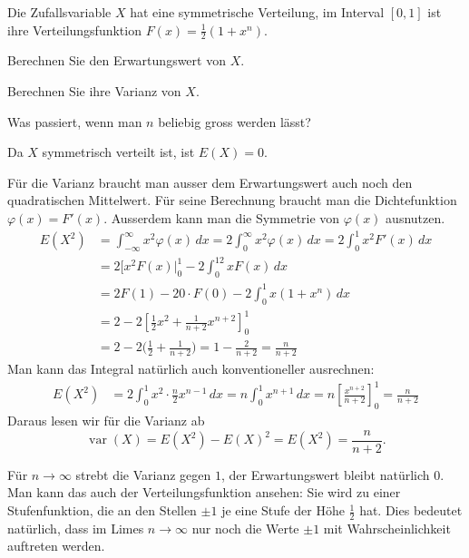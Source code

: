 Die Zufallsvariable $X$ hat eine symmetrische Verteilung, im
Interval $[0,1]$ ist ihre Verteilungsfunktion $F(x)=\frac12(1+x^n)$.
\begin{teilaufgaben}
\item
Berechnen Sie den Erwartungswert von $X$.
\item
Berechnen Sie ihre Varianz von $X$.
\item
Was passiert, wenn man $n$ beliebig gross werden lässt?
\end{teilaufgaben}


\begin{loesung}
\begin{teilaufgaben}
\item Da $X$ symmetrisch verteilt ist, ist $E(X)=0$.
\item
Für die Varianz braucht man ausser dem Erwartungswert auch noch
den quadratischen Mittelwert.  Für seine Berechnung braucht man die
Dichtefunktion $\varphi(x)=F'(x)$. Ausserdem kann man die Symmetrie
von $\varphi(x)$ ausnutzen.
\begin{align*}
E(X^2)
&=
\int_{-\infty}^{\infty}x^2\varphi(x)\,dx
=
2\int_{0}^{\infty}x^2\varphi(x)\,dx
=2\int_0^1 x^2 F'(x)\,dx\\
&=
2[x^2F(x)|_0^1-2\int_0^12xF(x)\,dx
\\
&=
2F(1)-20\cdot F(0)-2\int_0^1x(1+x^n)\,dx
\\
&=
2-2\left[
\frac12x^2+\frac1{n+2}x^{n+2}
\right]_0^1
\\
&=
2-2\biggl(\frac12+\frac1{n+2}\biggr)
=
1-\frac{2}{n+2}
=
\frac{n}{n+2}
\end{align*}
Man kann das Integral natürlich auch konventioneller ausrechnen:
\begin{align*}
E(X^2)&=2\int_0^1x^2\cdot\frac{n}2x^{n-1}\,dx
=
n\int_0^1x^{n+1}\,dx=n\left[\frac{x^{n+2}}{n+2}\right]_0^1
=\frac{n}{n+2}
\end{align*}
Daraus lesen wir für die Varianz ab
\[
\operatorname{var}(X)=E(X^2)-E(X)^2=E(X^2)=\frac{n}{n+2}.
\]
\item
Für $n\to\infty$ strebt die Varianz gegen $1$, der Erwartungswert
bleibt natürlich $0$. Man kann das auch der Verteilungsfunktion
ansehen: Sie wird zu einer Stufenfunktion, die an den Stellen
$\pm 1$ je eine Stufe der Höhe $\frac12$ hat. Dies bedeutet
natürlich, dass im Limes $n\to\infty$ nur noch die Werte $\pm1$ mit
Wahrscheinlichkeit auftreten werden.
\qedhere
\end{teilaufgaben}
\end{loesung}

